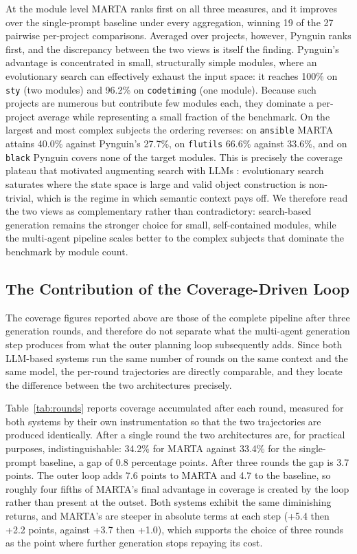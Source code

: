 At the module level MARTA ranks first on all three measures, and it improves over
the single-prompt baseline under every aggregation, winning 19 of the 27 pairwise
per-project comparisons. Averaged over projects, however, Pynguin ranks first, and
the discrepancy between the two views is itself the finding. Pynguin's advantage is
concentrated in small, structurally simple modules, where an evolutionary search can
effectively exhaust the input space: it reaches 100\% on \texttt{sty} (two modules)
and 96.2\% on \texttt{codetiming} (one module). Because such projects are numerous
but contribute few modules each, they dominate a per-project average while
representing a small fraction of the benchmark. On the largest and most complex
subjects the ordering reverses: on \texttt{ansible} MARTA attains 40.0\% against
Pynguin's 27.7\%, on \texttt{flutils} 66.6\% against 33.6\%, and on \texttt{black}
Pynguin covers none of the target modules. This is precisely the coverage plateau
that motivated augmenting search with LLMs \cite{lemieux2023codamosa}: evolutionary
search saturates where the state space is large and valid object construction is
non-trivial, which is the regime in which semantic context pays off. We therefore
read the two views as complementary rather than contradictory: search-based
generation remains the stronger choice for small, self-contained modules, while the
multi-agent pipeline scales better to the complex subjects that dominate the
benchmark by module count.

\subsection{The Contribution of the Coverage-Driven Loop}
\label{sec:outer-loop}

The coverage figures reported above are those of the complete pipeline after three
generation rounds, and therefore do not separate what the multi-agent generation step
produces from what the outer planning loop subsequently adds. Since both LLM-based
systems run the same number of rounds on the same context and the same model, the
per-round trajectories are directly comparable, and they locate the difference between
the two architectures precisely.

Table~\ref{tab:rounds} reports coverage accumulated after each round, measured for
both systems by their own instrumentation so that the two trajectories are produced
identically. After a single round the two architectures are, for practical purposes,
indistinguishable: 34.2\% for MARTA against 33.4\% for the single-prompt baseline, a
gap of 0.8 percentage points. After three rounds the gap is 3.7 points. The outer loop
adds 7.6 points to MARTA and 4.7 to the baseline, so roughly four fifths of MARTA's
final advantage in coverage is created by the loop rather than present at the outset.
Both systems exhibit the same diminishing returns, and MARTA's are steeper in absolute
terms at each step (+5.4 then +2.2 points, against +3.7 then +1.0), which supports the
choice of three rounds as the point where further generation stops repaying its cost.

